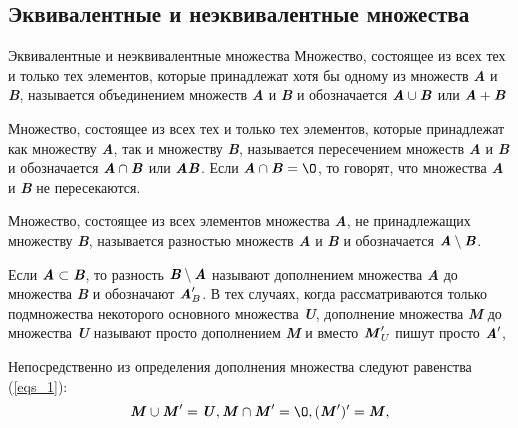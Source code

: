 \documentclass{beamer}
\begin{document}
    \subsection{Эквивалентные и неэквивалентные множества}
    \begin{frame}{Эквивалентные и неэквивалентные множества}
        \fontsize{10}{8}\selectfont Множество, состоящее из всех тех и только тех элементов, которые принадлежат хотя бы одному из множеств \textit{\textbf{A}} и \textit{\textbf{B}}, называется
        объединением множеств \textit{\textbf{A}} и \textit{\textbf{B}} и обозначается $\textbf{\textit{A}} \cup \textbf{\textit{B}}$ или $\textbf{\textit{A}} + \textbf{\textit{B}}$

        Множество, состоящее из всех тех и только тех элементов, которые принадлежат как множеству \textit{\textbf{A}}, так и множеству \textit{\textbf{B}}, называется пересечением множеств \textit{\textbf{A}} и \textit{\textbf{B}} и обозначается $\textbf{\textit{A}} \cap \textbf{\textit{B}}$ или $\textbf{\textit{A}}\textbf{\textit{B}}$. Если $\textbf{\textit{A}} \cap \textbf{\textit{B}} = \O$, то говорят, что множества \textit{\textbf{A}} и \textit{\textbf{B}} не пересекаются.

        Множество, состоящее из всех элементов множества \textit{\textbf{A}}, не принадлежащих множеству \textit{\textbf{B}}, называется разностью множеств \textit{\textbf{A}} и \textit{\textbf{B}} и обозначается $\textbf{\textit{A}} \setminus \textbf{\textit{B}}$.

        Если $\textit{\textbf{A}} \subset \textit{\textbf{B}}$, то разность $\textbf{\textit{B}} \setminus \textbf{\textit{A}}$ называют дополнением множества \textit{\textbf{A}} до множества \textit{\textbf{B}} и обозначают $\textbf{\textit{A}}_B^\prime$.
        В тех случаях, когда рассматриваются только подмножества некоторого основного множества \textit{\textbf{U}}, дополнение множества \textit{\textbf{M}} до множества \textit{\textbf{U}} называют просто дополнением \textit{\textbf{M}} и вместо $\textbf{\textit{M}}_U^\prime$ пишут просто $\textbf{\textit{A}}^\prime$,

        Непосредственно из определения дополнения множества следуют равенства (\ref{eqs_1}):
        \begin{equation}
            \label{eqs_1}
            \textbf{\textit{M}} \cup \textbf{\textit{M}}^\prime = \textbf{\textit{U}}, \textbf{\textit{M}} \cap \textbf{\textit{M}}^\prime = \O, (\textbf{\textit{M}}^\prime)^\prime = \textbf{\textit{M}},
        \end{equation}
    \end{frame}
\end{document}
